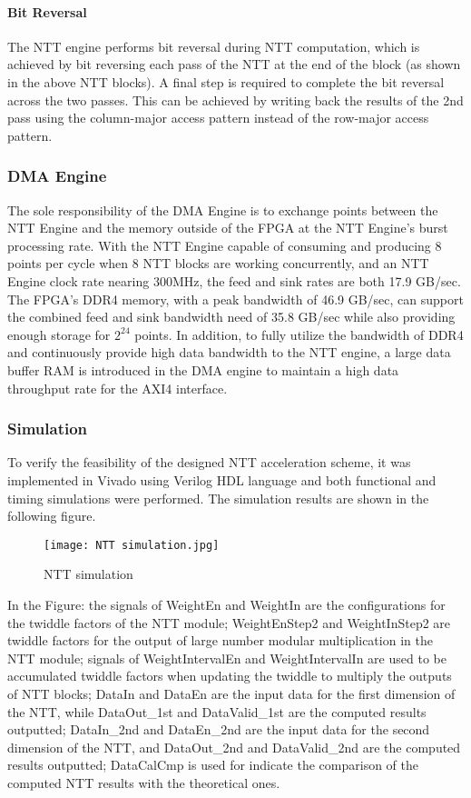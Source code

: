 \paragraph{Bit Reversal}
The NTT engine performs bit reversal during NTT computation, which is achieved by bit reversing each pass of the NTT at the end of the block (as shown in the above NTT blocks). A final step is required to complete the bit reversal across the two passes. This can be achieved by writing back the results of the 2nd pass using the column-major access pattern instead of the row-major access pattern.


\subsubsection{DMA Engine}

The sole responsibility of the DMA Engine is to exchange points between the NTT Engine and the memory outside of the FPGA at the NTT Engine's burst processing rate. With the NTT Engine capable of consuming and producing 8 points per cycle when 8 NTT blocks are working concurrently, and an NTT Engine clock rate nearing 300MHz, the feed and sink rates are both 17.9 GB/sec. The FPGA's DDR4 memory, with a peak bandwidth of 46.9 GB/sec, can support the combined feed and sink bandwidth need of 35.8 GB/sec while also providing enough storage for $2^{24}$ points.
  In addition, to fully utilize the bandwidth of DDR4 and continuously provide high data bandwidth to the NTT engine, a large data buffer RAM is introduced in the DMA engine to maintain a high data throughput rate for the AXI4 interface.

\subsubsection{Simulation}

To verify the feasibility of the designed NTT acceleration scheme, it was implemented in Vivado using Verilog HDL language and both functional and timing simulations were performed. The simulation results are shown in the following figure.

\begin{figure}[h]
  \centering
  \texttt{[image: NTT simulation.jpg]}
  \caption{NTT simulation}
  \label{fig:NTT_Simu}
\end{figure}

In the Figure: the signals of WeightEn and WeightIn are the configurations for the twiddle factors of the NTT module; WeightEnStep2 and WeightInStep2 are twiddle factors for the output of large number modular multiplication in the NTT module; signals of WeightIntervalEn and WeightIntervalIn are used to be accumulated twiddle factors when updating the twiddle to multiply the outputs of NTT blocks; DataIn and DataEn are the input data for the first dimension of the NTT, while DataOut\_1st and DataValid\_1st are the computed results outputted; DataIn\_2nd and DataEn\_2nd are the input data for the second dimension of the NTT, and DataOut\_2nd and DataValid\_2nd are the computed results outputted; DataCalCmp is used for indicate the comparison of the computed NTT results with the theoretical ones.

